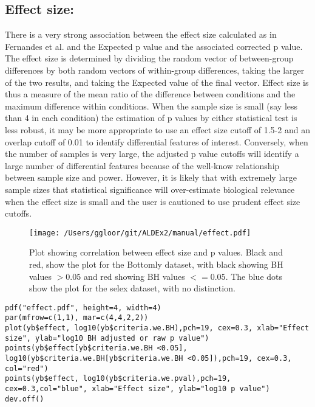 \documentclass[11pt]{amsart}
\begin{document}
\subsection*{Effect size:} There is a very strong association between the effect size calculated as in Fernandes et al.\cite{fernandes:2013} and the Expected p value and the associated corrected p value. The effect size is determined by dividing the random vector of between-group differences by both random vectors of within-group differences, taking the larger of the two results, and taking the Expected value of the final vector. Effect size is thus a measure of the mean ratio of the difference between conditions and the maximum difference within conditions. When the sample size is small (say less than 4 in each condition)  the estimation of p values by either statistical test is less robust, it may be more appropriate to use an effect size cutoff of 1.5-2 and an overlap cutoff of 0.01 to identify differential features of interest\cite{fernandes:2013}. Conversely, when the number of samples is very large, the adjusted p value cutoffs will identify a large number of differential features because of the well-know relationship between sample size and power. However, it is likely that with extremely large sample sizes that statistical significance will over-estimate biological relevance when the effect size is small and the user is cautioned to use prudent effect size cutoffs\cite{Nakagawa:2007}.
\begin{wrapfigure}{R}[-20mm]{0.4\textwidth}
\vspace{2cm}
\begin{center}
\texttt{[image: /Users/ggloor/git/ALDEx2/manual/effect.pdf]}
\caption{Plot showing correlation between effect size and p values. Black and red, show the plot for the Bottomly dataset, with black showing BH values $>0.05$ and red showing BH values $<= 0.05$. The blue dots show the plot for the selex dataset, with no distinction.}
\label{bottomly1}
\end{center}\vspace{-.5cm}
\end{wrapfigure}
\begin{verbatim}pdf("effect.pdf", height=4, width=4)
par(mfrow=c(1,1), mar=c(4,4,2,2))
plot(yb$effect, log10(yb$criteria.we.BH),pch=19, cex=0.3, xlab="Effect size", ylab="log10 BH adjusted or raw p value")
points(yb$effect[yb$criteria.we.BH <0.05], log10(yb$criteria.we.BH[yb$criteria.we.BH <0.05]),pch=19, cex=0.3, col="red")
points(yb$effect, log10(yb$criteria.we.pval),pch=19, cex=0.3,col="blue", xlab="Effect size", ylab="log10 p value")
dev.off()
\end{verbatim}
\end{document}
